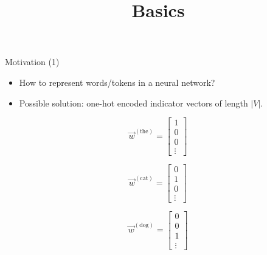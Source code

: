 



\newcommand{\titlefigure}{figure/linear-relationships.png}
\newcommand{\learninggoals}{
\item Understand what word embeddigns are
\item Learn the main methods for creating them}

\title{Basics}
\date{}




\begin{vbframe}{Motivation (1)}

\vfill

\begin{itemize}
	\item How to represent words/tokens in a neural network?
	\item Possible solution: one-hot encoded indicator vectors of length $|V|$.
\end{itemize}

\begin{center}
\begin{minipage}{.2\textwidth}
	\[\vec w^{({\text{the}})} =
	\begin{bmatrix}
	1 \\ 0 \\ 0 \\ \vdots
	\end{bmatrix}
	\]
\end{minipage}
\begin{minipage}{.2\textwidth}
	\[\vec w^{({\text{cat}})} =
	\begin{bmatrix}
	0 \\ 1 \\ 0 \\ \vdots
	\end{bmatrix}
	\]
\end{minipage}
\begin{minipage}{.2\textwidth}
\[\vec w^{({\text{dog}})} =
\begin{bmatrix}
0 \\ 0 \\ 1 \\ \vdots
\end{bmatrix}
\]
\end{minipage}
\end{center}


\end{vbframe}

